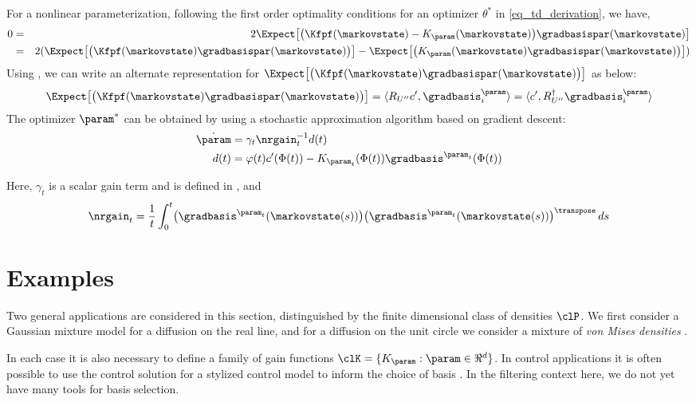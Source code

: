 For a nonlinear parameterization, following the first order optimality conditions for an optimizer $\theta^{*}$ in \eqref{eq_td_derivation}, we have,
\begin{eqnarray*}
	0 & = &2 \Expect \bigl[\bigl(\Kfpf(\markovstate) - K_{\param}(\markovstate)\bigr) \gradbasispar (\markovstate)\bigr]\\
	& = & 2 (\Expect \bigl[\bigl(\Kfpf(\markovstate)\gradbasispar (\markovstate)\bigr)\bigr] - \Expect \bigl[\bigl(K_{\param}(\markovstate)\gradbasispar (\markovstate)\bigr)\bigr])
\end{eqnarray*}
Using , we can write an alternate representation for $\Expect \bigl[\bigl(\Kfpf(\markovstate)\gradbasispar (\markovstate)\bigr)\bigr]$ as below:
\begin{eqnarray*}
	\Expect\bigl[\bigl(\Kfpf(\markovstate)\gradbasispar (\markovstate)\bigr)\bigr]=\langle R_{U''}c',\gradbasis_{i}^{\param}\rangle =\langle c', R_{U''}^\dagger \gradbasis_{i}^{\param}\rangle
\end{eqnarray*}
The optimizer $\param^{*}$ can be obtained by using a stochastic approximation algorithm based on gradient descent:
\begin{equation*}
\begin{aligned}
\dot{\param}&=\gamma_{t}\nrgain_{t}^{-1} d(t) \\
d(t) & =\varphi(t)c'(\Phi(t))-K_{\param_{t}}(\Phi(t))\gradbasis^{\param_{t}}(\Phi(t))
\end{aligned}
\end{equation*}

Here, $\gamma_{t}$ is a scalar gain term and is defined in , and
\[
\nrgain_{t} =\frac{1}{t}\int_{0}^{t}\bigl(\gradbasis^{\param_{t}}(\markovstate(s))\bigr)\bigl(\gradbasis^{\param_{t}}(\markovstate(s))\bigr)^{\transpose}\, ds
\]

\section{Examples}
\label{s:ex}

Two general applications are considered in this section, distinguished by the finite dimensional class of densities $\clP$.  We first consider a Gaussian mixture model for a diffusion on the real line,  and for a diffusion on the unit circle we consider a mixture of \textit{von Mises densities} \cite{haspea00}.

In each case it is also necessary to define a family of gain functions $\clK = \{K_\param : \param\in\Re^d\}$.  In control applications it is often possible to use the control solution for a stylized control model to inform the choice of basis  \cite{CTCN,huachemehmeysur11}.  In the filtering context here, we do not yet have many tools for basis selection.

